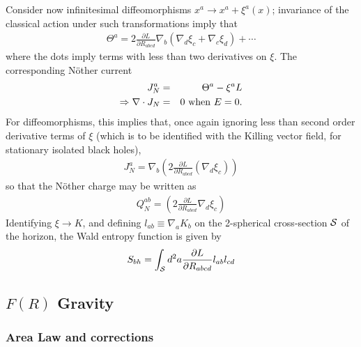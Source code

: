 \documentclass[11pt]{article}
\begin{document}
Consider now infinitesimal diffeomorphisms $x^a \rightarrow x^a + \xi^a(x)$; invariance of the classical action under such transformations imply that \cite{jkm1994}
\begin{eqnarray}
\Theta^a = 2 \frac{\partial L}{\partial R_{abcd}} \nabla_b(\nabla_d \xi_c + \nabla_c \xi_d) + \cdots  \label{diff}
\end{eqnarray}
where the dots imply terms with less than two derivatives on $\xi$. 
The corresponding N\"other current
\begin{eqnarray}
J_N^a &=& \Theta^a - \xi^a L \\ \label{nc}
\Rightarrow \nabla \cdot J_N &=& 0 ~{\rm when}~ E=0 . \label{con}
\end{eqnarray}
For diffeomorphisms, this implies that, once again ignoring less than second order derivative terms of $\xi$ (which is to be identified with the Killing vector field, for stationary isolated black holes), 
\begin{eqnarray}
J_N^a = \nabla_b \left(2 \frac{\partial L}{\partial R_{abcd}} (\nabla_d \xi_c) \right)
\end{eqnarray}
so that the N\"other charge may be written as 
\begin{eqnarray}
Q_N^{ab} = \left(2 \frac{\partial L}{\partial R_{abcd}} \nabla_d \xi_c \right) 
\end{eqnarray}
Identifying $\xi \rightarrow K$, and defining $l_{ab} \equiv \nabla_a K_b$ on the 2-spherical cross-section ${\cal S}$ of the horizon, the Wald entropy function is given by \cite{jkm1994}
\begin{eqnarray}
S_{bh} = \int_{\cal S} d^2a \frac{\partial L}{\partial R_{abcd}} l_{ab} l_{cd} \label{entr}
\end{eqnarray}   

\subsection{$F(R)$ Gravity}

\subsubsection{Area Law and corrections \cite{dmm2026}}
\end{document}
